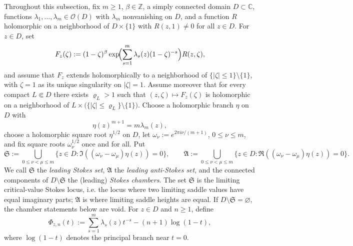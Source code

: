 \documentclass[reqno]{article}
\theoremstyle{definition}
\theoremstyle{remark}
\theoremstyle{plain}
\newcommand{\C}{\mathbb C}
\begin{document}
Throughout this subsection, fix $m\ge1$, $\beta\in\mathbb Z$, a simply connected domain $D\subset\C$, functions $\lambda_1,\dots,\lambda_m\in\mathcal O(D)$ with $\lambda_m$ nonvanishing on $D$, and a function $R$ holomorphic on a neighborhood of $D\times\{1\}$ with $R(z,1)\ne0$ for all $z\in D$. For $z\in D$, set
$$F_z(\zeta):=(1-\zeta)^\beta \exp\!\Bigl(\sum_{s=1}^m \lambda_s(z)(1-\zeta)^{-s}\Bigr)R(z,\zeta),$$
and assume that $F_z$ extends holomorphically to a neighborhood of $\{|\zeta|\le1\}\setminus\{1\}$, with $\zeta=1$ as its unique singularity on $|\zeta|=1$. Assume moreover that for every compact $L\Subset D$ there exists $\varrho_L>1$ such that $(z,\zeta)\mapsto F_z(\zeta)$ is holomorphic on a neighborhood of $L\times\bigl(\{|\zeta|\le\varrho_L\}\setminus\{1\}\bigr)$. Choose a holomorphic branch $\eta$ on $D$ with
$$\eta(z)^{m+1}=m\lambda_m(z),$$
choose a holomorphic square root $\eta^{1/2}$ on $D$, let $\omega_\nu:=e^{2\pi i\nu/(m+1)}$, $0\le\nu\le m$, and fix square roots $\omega_\nu^{1/2}$ once and for all. Put
\begin{equation}\label{eq:wright-stokes-sets}
\mathfrak S:=\bigcup_{0\le\nu<\mu\le m}\{z\in D:\Im((\omega_\nu-\omega_\mu)\eta(z))=0\},\qquad
\mathfrak A:=\bigcup_{0\le\nu<\mu\le m}\{z\in D:\Re((\omega_\nu-\omega_\mu)\eta(z))=0\}.
\end{equation}
We call $\mathfrak S$ the \emph{leading Stokes set}, $\mathfrak A$ the \emph{leading anti-Stokes set}, and the connected components of $D\setminus\mathfrak S$ the (leading) \emph{Stokes chambers}. The set $\mathfrak S$ is the limiting critical-value Stokes locus, i.e. the locus where two limiting saddle values have equal imaginary parts; $\mathfrak A$ is where limiting saddle heights are equal. If $D\setminus\mathfrak S=\varnothing$, the chamber statements below are void. For $z\in D$ and $n\ge1$, define
$$\Phi_{z,n}(t):=\sum_{s=1}^m \lambda_s(z)t^{-s}-(n+1)\log(1-t),$$
where $\log(1-t)$ denotes the principal branch near $t=0$.
\end{document}
